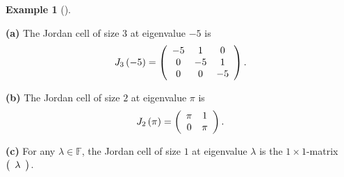 \documentclass[numbers=enddot,12pt,final,onecolumn,notitlepage]{scrartcl}%
\numberwithin{exer}{subsection}
\theoremstyle{definition}
\newtheorem{exam}[theo]{Example}
\newenvironment{example}[1][]
{\begin{exam}[#1]\begin{leftbar}}
{\end{leftbar}\end{exam}}
\begin{document}
\begin{example}
\textbf{(a)} The Jordan cell of size $3$ at eigenvalue $-5$ is%
\[
J_{3}\left(  -5\right)  =\left(
\begin{array}
[c]{ccc}%
-5 & 1 & 0\\
0 & -5 & 1\\
0 & 0 & -5
\end{array}
\right)  .
\]


\textbf{(b)} The Jordan cell of size $2$ at eigenvalue $\pi$ is%
\[
J_{2}\left(  \pi\right)  =\left(
\begin{array}
[c]{cc}%
\pi & 1\\
0 & \pi
\end{array}
\right)  .
\]


\textbf{(c)} For any $\lambda\in\mathbb{F}$, the Jordan cell of size $1$ at
eigenvalue $\lambda$ is the $1\times1$-matrix $\left(
\begin{array}
[c]{c}%
\lambda
\end{array}
\right)  $.
\end{example}
\end{document}

